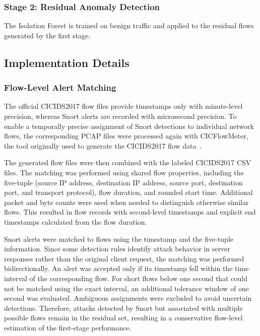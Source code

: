 \documentclass[conference]{IEEEtran}
\begin{document}
\subsubsection{Stage 2: Residual Anomaly Detection}
\label{subsec:isolation-forest}
The Isolation Forest is trained on benign traffic and applied to the residual
flows generated by the first stage.


\subsection{Implementation Details}
\label{subsec:implementation-details}
\subsubsection{Flow-Level Alert Matching}
The official CICIDS2017 flow files provide timestamps only with minute-level
precision, whereas Snort alerts are recorded with microsecond precision. To
enable a temporally precise assignment of Snort detections to individual
network flows, the corresponding PCAP files were processed again with
CICFlowMeter, the tool originally used to generate the CICIDS2017 flow data~\cite{sharafaldin2018}.

The generated flow files were then combined with the labeled CICIDS2017 CSV files. The matching was performed using shared flow properties, including the five-tuple (source IP address, destination IP address, source port, destination port, and transport protocol), flow duration, and rounded start time. Additional packet and byte counts were used when needed to distinguish otherwise similar flows. This resulted in flow records with second-level timestamps and explicit end timestamps calculated from the flow duration.

Snort alerts were matched to flows using the timestamp and the five-tuple information. Since some detection rules identify attack behavior in server responses rather than the original client request, the matching was performed
bidirectionally. An alert was accepted only if its timestamp fell within the
time interval of the corresponding flow. For short flows below one second that
could not be matched using the exact interval, an additional tolerance window
of one second was evaluated. Ambiguous assignments were excluded to avoid
uncertain detections. Therefore, attacks detected by Snort but associated with
multiple possible flows remain in the residual set, resulting in a conservative
flow-level estimation of the first-stage performance.
\end{document}
